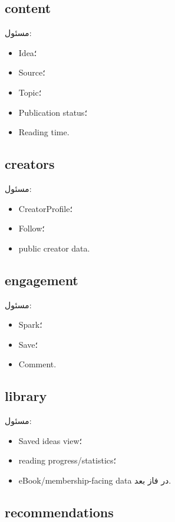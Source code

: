 \subsection{content}

مسئول:
\begin{itemize}
  \item Idea؛
  \item Source؛
  \item Topic؛
  \item Publication status؛
  \item Reading time.
\end{itemize}

\subsection{creators}

مسئول:
\begin{itemize}
  \item CreatorProfile؛
  \item Follow؛
  \item public creator data.
\end{itemize}

\subsection{engagement}

مسئول:
\begin{itemize}
  \item Spark؛
  \item Save؛
  \item Comment.
\end{itemize}

\subsection{library}

مسئول:
\begin{itemize}
  \item Saved ideas view؛
  \item reading progress/statistics؛
  \item eBook/membership-facing data در فاز بعد.
\end{itemize}

\subsection{recommendations}

